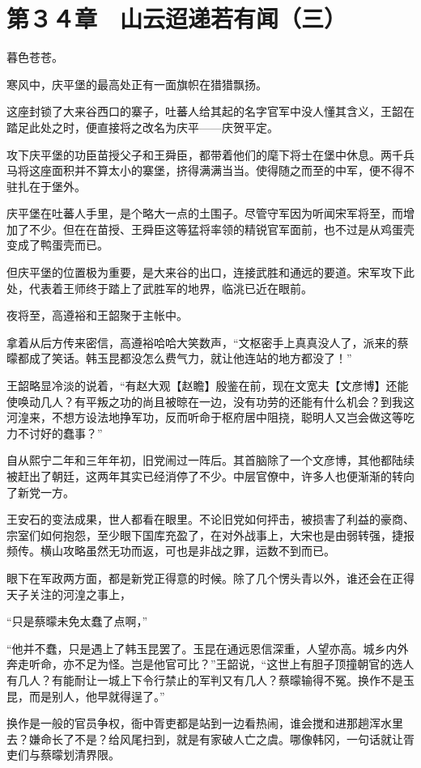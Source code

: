 \section{第３４章　山云迢递若有闻（三） }

暮色苍苍。

寒风中，庆平堡的最高处正有一面旗帜在猎猎飘扬。

这座封锁了大来谷西口的寨子，吐蕃人给其起的名字官军中没人懂其含义，王韶在踏足此处之时，便直接将之改名为庆平——庆贺平定。

攻下庆平堡的功臣苗授父子和王舜臣，都带着他们的麾下将士在堡中休息。两千兵马将这座面积并不算太小的寨堡，挤得满满当当。使得随之而至的中军，便不得不驻扎在于堡外。

庆平堡在吐蕃人手里，是个略大一点的土围子。尽管守军因为听闻宋军将至，而增加了不少。但在在苗授、王舜臣这等猛将率领的精锐官军面前，也不过是从鸡蛋壳变成了鸭蛋壳而已。

但庆平堡的位置极为重要，是大来谷的出口，连接武胜和通远的要道。宋军攻下此处，代表着王师终于踏上了武胜军的地界，临洮已近在眼前。

夜将至，高遵裕和王韶聚于主帐中。

拿着从后方传来密信，高遵裕哈哈大笑数声，“文枢密手上真真没人了，派来的蔡曚都成了笑话。韩玉昆都没怎么费气力，就让他连站的地方都没了！”

王韶略显冷淡的说着，“有赵大观【赵瞻】殷鉴在前，现在文宽夫【文彦博】还能使唤动几人？有平叛之功的尚且被晾在一边，没有功劳的还能有什么机会？到我这河湟来，不想方设法地挣军功，反而听命于枢府居中阻挠，聪明人又岂会做这等吃力不讨好的蠢事？”

自从熙宁二年和三年年初，旧党闹过一阵后。其首脑除了一个文彦博，其他都陆续被赶出了朝廷，这两年其实已经消停了不少。中层官僚中，许多人也便渐渐的转向了新党一方。

王安石的变法成果，世人都看在眼里。不论旧党如何抨击，被损害了利益的豪商、宗室们如何抱怨，至少眼下国库充盈了，在对外战事上，大宋也是由弱转强，捷报频传。横山攻略虽然无功而返，可也是非战之罪，运数不到而已。

眼下在军政两方面，都是新党正得意的时候。除了几个愣头青以外，谁还会在正得天子关注的河湟之事上，

“只是蔡曚未免太蠢了点啊，”

“他并不蠢，只是遇上了韩玉昆罢了。玉昆在通远恩信深重，人望亦高。城乡内外奔走听命，亦不足为怪。岂是他官可比？”王韶说，“这世上有胆子顶撞朝官的选人有几人？有能耐让一城上下令行禁止的军判又有几人？蔡曚输得不冤。换作不是玉昆，而是别人，他早就得逞了。”

换作是一般的官员争权，衙中胥吏都是站到一边看热闹，谁会搅和进那趟浑水里去？嫌命长了不是？给风尾扫到，就是有家破人亡之虞。哪像韩冈，一句话就让胥吏们与蔡曚划清界限。

